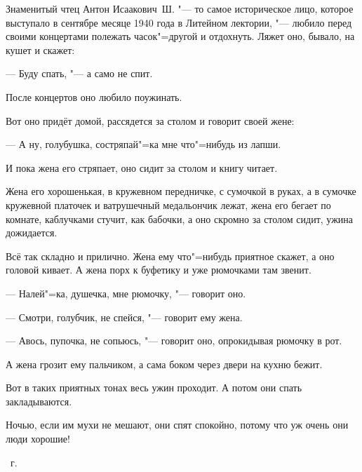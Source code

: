 Знаменитый чтец Антон Исаакович~Ш. "--- то самое историческое лицо, которое
выступало в сентябре месяце 1940 года в Литейном лектории, "--- любило перед своими
концертами полежать часок"=другой и отдохнуть. Ляжет оно, бывало, на кушет и скажет:

--- Буду спать, "--- а само не спит.

После концертов оно любило поужинать.

Вот оно придёт домой, рассядется за столом и говорит своей жене:

--- А ну, голубушка, состряпай"=ка мне что"=нибудь из лапши.

И пока жена его стряпает, оно сидит за столом и книгу читает.

Жена его хорошенькая, в кружевном передничке, с сумочкой в руках, а в сумочке
кружевной платочек и ватрушечный медальончик лежат, жена его бегает по комнате,
каблучками стучит, как бабочки, а оно скромно за столом сидит, ужина дожидается.

Всё так складно и прилично. Жена ему что"=нибудь приятное скажет, а оно головой
кивает. А жена порх к буфетику и уже рюмочками там звенит.

--- Налей"=ка, душечка, мне рюмочку, "--- говорит оно.

--- Смотри, голубчик, не спейся, "--- говорит ему жена.

--- Авось, пупочка, не сопьюсь, "--- говорит оно, опрокидывая рюмочку в рот.

А жена грозит ему пальчиком, а сама боком через двери на кухню бежит.

Вот в таких приятных тонах весь ужин проходит. А потом они спать закладываются.

Ночью, если им мухи не мешают, они спят спокойно, потому что уж очень они
люди хорошие!

\medskip
{}~г.
